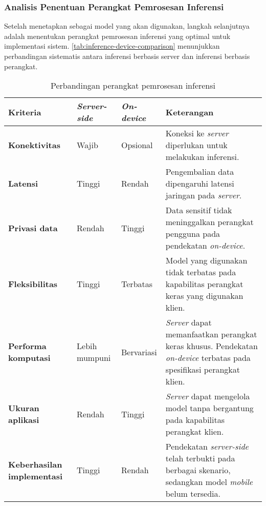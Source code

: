 \subsubsection{Analisis Penentuan Perangkat Pemrosesan Inferensi}
\label{subsubsec:analisis-penentuan-perangkat-pemrosesan-inferensi}

Setelah menetapkan \donut{} sebagai model yang akan digunakan, langkah selanjutnya adalah menentukan perangkat pemrosesan inferensi yang optimal untuk implementasi sistem. \autoref{tab:inference-device-comparison} menunjukkan perbandingan sistematis antara inferensi berbasis server dan inferensi berbasis perangkat.

\begin{table}[h!]
\caption{Perbandingan perangkat pemrosesan inferensi}
\label{tab:inference-device-comparison}
\begin{tabularx}{\linewidth}{|p{3cm}|p{2cm}|p{2cm}|X|}
\hline
\textbf{Kriteria} & \textbf{\emph{Server-side}} & \textbf{\emph{On-device}} & \textbf{Keterangan} \\
\hline
\textbf{Konektivitas} & Wajib & Opsional & Koneksi ke \emph{server} diperlukan untuk melakukan inferensi. \\
\hline
\textbf{Latensi} & Tinggi & Rendah & Pengembalian data dipengaruhi latensi jaringan pada \emph{server}. \\
\hline
\textbf{Privasi data} & Rendah & Tinggi & Data sensitif tidak meninggalkan perangkat pengguna pada pendekatan \emph{on-device}. \\
\hline
\textbf{Fleksibilitas} & Tinggi & Terbatas & Model yang digunakan tidak terbatas pada kapabilitas perangkat keras yang digunakan klien. \\
\hline
\textbf{Performa komputasi} & Lebih mumpuni & Bervariasi & \emph{Server} dapat memanfaatkan perangkat keras khusus. Pendekatan \emph{on-device} terbatas pada spesifikasi perangkat klien. \\
\hline
\textbf{Ukuran aplikasi} & Rendah & Tinggi & \emph{Server} dapat mengelola model tanpa bergantung pada kapabilitas perangkat klien. \\
\hline
\textbf{Keberhasilan implementasi} & Tinggi & Rendah & Pendekatan \emph{server-side} telah terbukti pada berbagai skenario, sedangkan model \emph{mobile} belum tersedia. \\
\hline
\end{tabularx}
\end{table}


